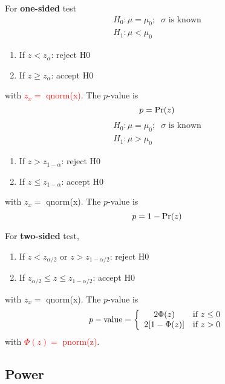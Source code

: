 For {\bf one-sided} test
\begin{equation*}
  \begin{split}
    H_0: \mu = \mu_0;\;\; \sigma \text{ is known}\\
    H_1: \mu < \mu_0 
  \end{split}
\end{equation*}
\begin{enumerate}
\item If $z<z_{\alpha}$: reject H0
\item If $z \ge z_{\alpha}$: accept H0
\end{enumerate}
with \textcolor{red}{$z_x = $ qnorm(x)}. The $p$-value is
\begin{equation}
  \label{eq:66}
  p = \text{Pr}(z)
\end{equation}
\begin{equation*}
  \begin{split}
    H_0: \mu = \mu_0;\;\; \sigma \text{ is known}\\
    H_1: \mu > \mu_0
  \end{split}
\end{equation*}
\begin{enumerate}
\item If $z>z_{1-\alpha}$: reject H0
\item If $z \le z_{1-\alpha}$: accept H0
\end{enumerate}
with $z_x = $ qnorm(x). The $p$-value is
\begin{equation}
  \label{eq:66}
  p = 1-\text{Pr}(z)
\end{equation}


For {\bf two-sided} test, 
\begin{enumerate}
\item If $z<z_{\alpha/2}$ or $z>z_{1-\alpha/2}$: reject H0
\item If $z_{\alpha/2} \le z \le z_{1-\alpha/2}$: accept H0
\end{enumerate}
with $z_x = $ qnorm(x).  The $p$-value is
\begin{equation}
  \label{eq:65}
  p-\text{value} = \left\{
    \begin{array}{cc}
      2\Phi(z) & \text{if } z \le 0 \\
      2[1-\Phi(z)] & \text{if } z > 0 \\
    \end{array}
  \right.  
\end{equation}
with \textcolor{red}{ $\Phi(z)=$ pnorm(z)}.

\subsection{Power }
\label{sec:power-}

